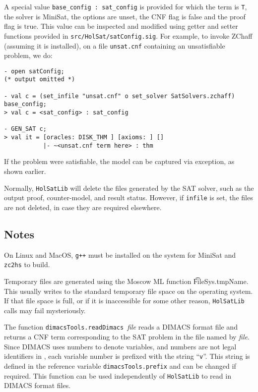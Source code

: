 A special value \texttt{base\_config~:~sat\_config} is provided for which the term is \texttt{T}, the solver is MiniSat, the options are unset, the CNF flag is false and the proof flag is true. This value can be inspected and modified using getter and setter functions provided in \texttt{src/HolSat/satConfig.sig}. For example, to invoke ZChaff (assuming it is installed), on a file \texttt{unsat.cnf} containing an unsatisfiable problem, we do:

\begin{session}
\begin{verbatim}
- open satConfig;
(* output omitted *)

- val c = (set_infile "unsat.cnf" o set_solver SatSolvers.zchaff) base_config;
> val c = <sat_config> : sat_config

- GEN_SAT c;
> val it = [oracles: DISK_THM ] [axioms: ] []
           |- ~<unsat.cnf term here> : thm
\end{verbatim}
\end{session}

If the problem were satisfiable, the model can be captured via exception, as shown earlier.

Normally, {\tt{HolSatLib}} will delete the files generated by the SAT solver, such as the output proof, counter-model, and result status. However, if \texttt{infile} is set, the files are not deleted, in case they are required elsewhere.

\subsection{Notes}

On Linux and MacOS, \texttt{g++} must be installed on the system for MiniSat and \texttt{zc2hs} to build.

Temporary files are generated using the Moscow ML function \t{FileSys.tmpName}. This usually writes to the standard temporary file space on the operating system. If that file space is full, or if it is inaccessible for some other reason, {\tt{HolSatLib}} calls may fail mysteriously.

The function {\tt dimacsTools.readDimacs}~{\it file}  reads a DIMACS format file and returns
a CNF \HOL{} term corresponding to the SAT problem in the file named by {\it file}. Since DIMACS uses numbers to denote variables, and numbers are not legal identifiers in \HOL{}, each variable number is prefixed with the string ``{\tt v}''. This string is defined in the reference variable {\tt dimacsTools.prefix} and can be changed if required. This function can be used independently of {\tt{HolSatLib}} to read in DIMACS format files.


%
